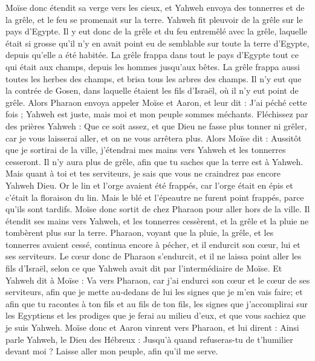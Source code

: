 \begin{multicols}{2}
Moïse donc étendit sa verge vers les cieux, et Yahweh envoya des tonnerres et de la grêle, et le feu se promenait sur la terre. Yahweh fit pleuvoir de la grêle sur le pays d'Egypte.
Il y eut donc de la grêle et du feu entremêlé avec la grêle, laquelle était si grosse qu'il n'y en avait point eu de semblable sur toute la terre d'Egypte, depuis qu'elle a été habitée.
La grêle frappa dans tout le pays d'Egypte tout ce qui était aux champs, depuis les hommes jusqu'aux bêtes. La grêle frappa aussi toutes les herbes des champs, et brisa tous les arbres des champs.
Il n'y eut que la contrée de Gosen, dans laquelle étaient les fils d'Israël, où il n'y eut point de grêle.
Alors Pharaon envoya appeler Moïse et Aaron, et leur dit : J'ai péché cette fois ; Yahweh est juste, mais moi et mon peuple sommes méchants.
Fléchissez  par des prières Yahweh : Que ce soit assez, et que Dieu ne fasse plus tonner ni grêler, car je vous laisserai aller, et on ne vous arrêtera plus.
Alors Moïse dit : Aussitôt que je sortirai de la ville, j'étendrai mes mains vers Yahweh et les tonnerres cesseront. Il n'y aura plus de grêle, afin que tu saches que la terre est à Yahweh.
Mais quant à toi et tes serviteurs, je sais que vous ne craindrez pas encore Yahweh Dieu.
Or le lin et l'orge avaient été frappés, car l'orge était en épis et c’était la floraison du lin.
 Mais le blé et l'épeautre ne furent point frappés, parce qu'ils sont tardifs.
Moïse donc sortit de chez Pharaon pour aller hors de la ville. Il étendit ses mains vers Yahweh, et les tonnerres cessèrent, et la grêle et la pluie ne tombèrent plus sur la terre.
Pharaon, voyant que la pluie, la grêle, et les tonnerres avaient cessé, continua encore à pécher, et il endurcit son cœur, lui et ses serviteurs.
Le cœur donc de Pharaon s'endurcit, et il ne laissa point aller les fils d'Israël, selon ce que Yahweh avait dit par l’intermédiaire de Moïse.
\VerseOne{} Et Yahweh dit à Moïse : Va vers Pharaon, car j'ai endurci son cœur et le cœur de ses serviteurs, afin que je mette au-dedans de lui les signes que je m'en vais faire;
et afin que tu racontes à ton fils et au fils de ton fils, les signes que j’accomplirai sur les Egyptiens et les prodiges que je ferai au milieu d'eux, et que vous sachiez que je suis Yahweh.
Moïse donc et Aaron vinrent  vers Pharaon, et lui dirent : Ainsi parle Yahweh, le Dieu des Hébreux : Jusqu'à quand refuseras-tu de t'humilier devant moi ? Laisse aller mon peuple, afin qu'il me serve.

\end{multicols}
